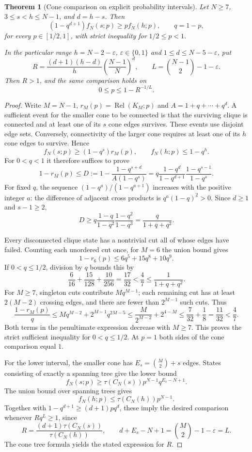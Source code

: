 \documentclass[
  11pt,
]{article}
\newtheorem{theorem}{Theorem}[section]
\theoremstyle{definition}
\theoremstyle{remark}
\begin{document}
\begin{theorem}[Cone comparison on explicit probability intervals]\label{thm:coneintervals}
Let $N\ge7$, $3\le s<h\le N-1$, and $d=h-s$. Then
$$
(1-q^{d+1})f_N(s;p)\ge p f_N(h;p),\qquad q=1-p,
$$
for every $p\in[1/2,1]$, with strict inequality for $1/2\le p<1$.

In the particular range $h=N-2-\varepsilon$, $\varepsilon\in\{0,1\}$ and $1\le d\le N-5-\varepsilon$, put
$$
R=\frac{(d+1)(h-d)}{h}\left(\frac{N-1}{N}\right)^d,
\qquad L=\binom{N-1}{2}-1-\varepsilon.
$$
Then $R>1$, and the same comparison holds on
$$0\le p\le1-R^{-1/L}.$$
\end{theorem}

\begin{proof}
Write $M=N-1$, $r_M(p)=\operatorname{Rel}(K_M;p)$ and $A=1+q+\cdots+q^d$. A sufficient event for the smaller cone to be connected is that the surviving clique is connected and at least one of its $s$ cone edges survives. These events use disjoint edge sets. Conversely, connectivity of the larger cone requires at least one of its $h$ cone edges to survive. Hence
$$f_N(s;p)\ge(1-q^s)r_M(p),\qquad f_N(h;p)\le1-q^h.$$
For $0<q<1$ it therefore suffices to prove
$$
1-r_M(p)\le D:=1-\frac{1-q^{s+d}}{A(1-q^s)}
=q\frac{1-q^d}{1-q^{d+1}}\frac{1-q^{s-1}}{1-q^s}.
$$
For fixed $q$, the sequence $(1-q^a)/(1-q^{a+1})$ increases with the positive integer $a$: the difference of adjacent cross products is $q^a(1-q)^2>0$. Since $d\ge1$ and $s-1\ge2$,
$$D\ge q\frac{1-q}{1-q^2}\frac{1-q^2}{1-q^3}
=\frac{q}{1+q+q^2}.$$

Every disconnected clique state has a nontrivial cut all of whose edges have failed. Counting each unordered cut once, for $M=6$ the union bound gives
$$1-r_6(p)\le6q^5+15q^8+10q^9.$$
If $0<q\le1/2$, division by $q$ bounds this by
$$\frac6{16}+\frac{15}{128}+\frac{10}{256}
=\frac{17}{32}<\frac47\le\frac1{1+q+q^2}.$$
For $M\ge7$, singleton cuts contribute $Mq^{M-1}$; each remaining cut has at least $2(M-2)$ crossing edges, and there are fewer than $2^{M-1}$ such cuts. Thus
$$
\frac{1-r_M(p)}q
\le Mq^{M-2}+2^{M-1}q^{2M-5}
\le\frac{M}{2^{M-2}}+2^{4-M}
\le\frac7{32}+\frac18=\frac{11}{32}<\frac47.
$$
Both terms in the penultimate expression decrease with $M\ge7$. This proves the strict sufficient inequality for $0<q\le1/2$. At $p=1$ both sides of the cone comparison equal $1$.

For the lower interval, the smaller cone has $E_s=\binom M2+s$ edges. States consisting of exactly a spanning tree give the lower bound
$$f_N(s;p)\ge\tau(C_N(s))p^{N-1}q^{E_s-N+1}.$$
The union bound over spanning trees gives
$$f_N(h;p)\le\tau(C_N(h))p^{N-1}.$$
Together with $1-q^{d+1}\ge(d+1)pq^d$, these imply the desired comparison whenever $Rq^L\ge1$, since
$$
R=\frac{(d+1)\tau(C_N(s))}{\tau(C_N(h))},
\qquad d+E_s-N+1=\binom M2-1-\varepsilon=L.
$$
The cone tree formula yields the stated expression for $R$.


\end{proof}
\end{document}
